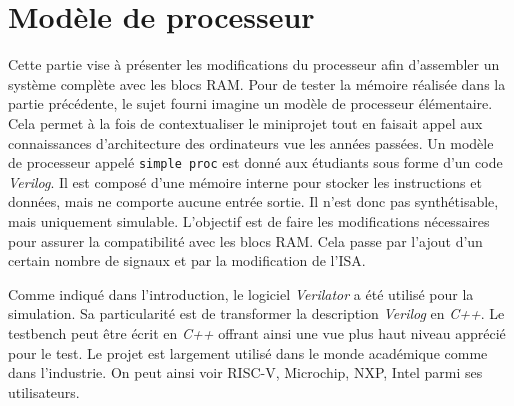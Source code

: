 \section{Modèle de processeur}

Cette partie vise à présenter les modifications du processeur afin d'assembler un système complète avec les blocs \gls{RAM}. 
Pour de tester la mémoire réalisée dans la partie précédente, le sujet fourni imagine un modèle de processeur élémentaire.
Cela permet à la fois de contextualiser le miniprojet tout en faisait appel aux connaissances d'architecture des ordinateurs vue les années passées.
Un modèle de processeur appelé \texttt{simple proc} est donné aux étudiants sous forme d'un code \textit{Verilog}.
Il est composé d'une mémoire interne pour stocker les instructions et données, mais ne comporte aucune entrée sortie.
Il n'est donc pas synthétisable, mais uniquement simulable.
L'objectif est de faire les modifications nécessaires pour assurer la compatibilité avec les blocs \gls{RAM}.
Cela passe par l'ajout d'un certain nombre de signaux et par la modification de l'\gls{ISA}. \\ 
\gap

Comme indiqué dans l'introduction, le logiciel \textit{Verilator} a été utilisé pour la simulation.
Sa particularité est de transformer la description \textit{Verilog} en \textit{C++}.
Le testbench peut être écrit en \textit{C++} offrant ainsi une vue plus haut niveau apprécié pour le test.
Le projet est largement utilisé dans le monde académique comme dans l'industrie.
On peut ainsi voir RISC-V, Microchip, NXP, Intel parmi ses utilisateurs.


